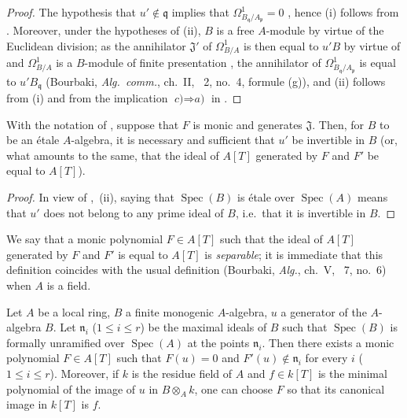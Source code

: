\begin{proof}
The hypothesis that $u'\notin\mathfrak{q}$ implies that $\Omega^1_{B_\mathfrak{q}/A_\mathfrak{p}}=0$ , hence (i) follows from .
Moreover, under the hypotheses of (ii), $B$ is a free $A$-module by virtue of the Euclidean division;
as the annihilator $\mathfrak{J}'$ of $\Omega^1_{B/A}$ is then equal to $u'B$ by virtue of  and $\Omega^1_{B/A}$ is a $B$-module of finite presentation , the annihilator of $\Omega^1_{B_\mathfrak{q}/A_\mathfrak{p}}$ is equal to $u'B_\mathfrak{q}$ (Bourbaki, \emph{Alg.\ comm.}, ch.~II, \textsection~2, no.~4, formule (g)), and (ii) follows from (i) and from the implication $\textit{c)}\Rightarrow\textit{a)}$ in .
\end{proof}

\begin{corollary}[18.4.3]
\label{IV.18.4.3}
With the notation of , suppose that $F$ is monic and generates $\mathfrak{J}$.
Then, for $B$ to be an \'etale $A$-algebra, it is necessary and sufficient that $u'$ be invertible in $B$ \textup{(or, what amounts to the same, that the ideal of $A[T]$ generated by $F$ and $F'$ be equal to $A[T]$)}.
\end{corollary}

\begin{proof}
In view of ,~(ii), saying that $\operatorname{Spec}(B)$ is \'etale over $\operatorname{Spec}(A)$ means that $u'$ does not belong to any prime ideal of $B$, i.e.\ that it is invertible in $B$.
\end{proof}

We say that a monic polynomial $F\in A[T]$ such that the ideal of $A[T]$ generated by $F$ and $F'$ is equal to $A[T]$ is \emph{separable};
it is immediate that this definition coincides with the usual definition (Bourbaki, \emph{Alg.}, ch.~V, \textsection~7, no.~6) when $A$ is a field.

\begin{lemma}[18.4.4]
\label{IV.18.4.4}
Let $A$ be a local ring, $B$ a finite monogenic $A$-algebra, $u$ a generator of the $A$-algebra $B$.
Let $\mathfrak{n}_i$ \textup{(}$1\leq i\leq r$\textup{)} be the maximal ideals of $B$ such that $\operatorname{Spec}(B)$ is formally unramified over $\operatorname{Spec}(A)$ at the points $\mathfrak{n}_i$.
Then there exists a monic polynomial $F\in A[T]$ such that $F(u)=0$ and $F'(u)\notin\mathfrak{n}_i$ for every $i$ \textup{(}$1\leq i\leq r$\textup{)}.
Moreover, if $k$ is the
residue field of $A$ and $f\in k[T]$ is the minimal polynomial of the image of $u$ in $B\otimes_A k$, one can choose $F$ so that its canonical image in $k[T]$ is $f$.
\end{lemma}

